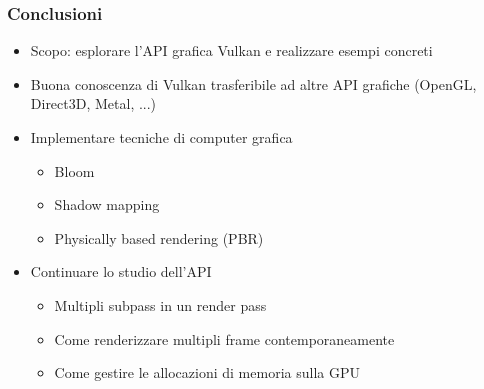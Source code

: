 \begin{frame}
\frametitle{Conclusioni}
\begin{itemize}
\item Scopo: esplorare l'API grafica Vulkan e realizzare esempi concreti
\item Buona conoscenza di Vulkan trasferibile ad altre API grafiche (OpenGL, Direct3D, Metal, ...)
\item Implementare tecniche di computer grafica
\begin{itemize}
\item Bloom
\item Shadow mapping
\item Physically based rendering (PBR)
\end{itemize}
\item Continuare lo studio dell'API
\begin{itemize}
\item Multipli subpass in un render pass
\item Come renderizzare multipli frame contemporaneamente
\item Come gestire le allocazioni di memoria sulla GPU
\end{itemize}
\end{itemize}
\end{frame}
